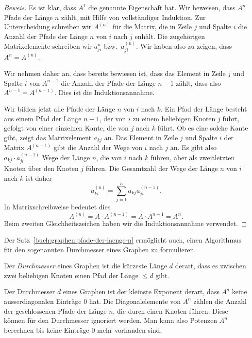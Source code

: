 \begin{proof}[Beweis]
Es ist klar, dass $A^1$ die genannte Eigenschaft hat.
Wir beweisen, dass $A^n$ Pfade der Länge $n$ zählt, mit Hilfe von
vollständiger Induktion.
Zur Unterscheidung schreiben wir $A^{(n)}$ für die Matrix, die in Zeile
$j$ und Spalte $i$ die Anzahl der Pfade der Länge $n$ von $i$ nach $j$
enhält.
Die zugehörigen Matrixelemente schreiben wir $a_{ji}^{n}$ bzw.~$a_{ji}^{(n)}$.
Wir haben also zu zeigen, dass $A^n = A^{(n)}$.

Wir nehmen daher an, dass bereits bewiesen ist, dass das Element in Zeile
$j$ und Spalte $i$ von $A^{n-1}$ die Anzahl der Pfade der Länge $n-1$
zählt, dass also $A^{n-1}=A^{(n-1)}$.
Dies ist die Induktionsannahme.

Wir bilden jetzt alle Pfade der Länge $n$ von $i$ nach $k$.
Ein Pfad der Länge besteht aus einem Pfad der Länge $n-1$, der von $i$ zu
einem beliebigen Knoten $j$ führt, gefolgt von einer einzelnen Kante,
die von $j$ nach $k$ führt.
Ob es eine solche Kante gibt, zeigt das Matrixelement $a_{kj}$ an.
Das Element in Zeile $j$ und Spalte $i$ der Matrix $A^{(n-1)}$ gibt
die Anzahl der Wege von $i$ nach $j$ an.
Es gibt also $a_{kj}\cdot a_{ji}^{(n-1)}$ Wege der Länge $n$, die von $i$
nach $k$ führen, aber als zweitletzten Knoten über den Knoten $j$ führen.
Die Gesamtzahl der Wege der Länge $n$ von $i$ nach $k$ ist daher
\[
a_{ki}^{(n)}
=
\sum_{j=1}^n a_{kj} a_{ji}^{(n-1)}.
\]
In Matrixschreibweise bedeutet dies
\[
A^{(n)}
=
A\cdot A^{(n-1)}
=
A\cdot A^{n-1}
=
A^n.
\]
Beim zweiten Gleichheitszeichen haben wir die Induktionsannahme
verwendet.
\end{proof}

Der Satz~\ref{buch:graphen:pfade-der-laenge-n} ermöglicht auch, einen 
Algorithmus für den sogenannten Durchmesser eines Graphen zu formulieren.

\begin{definition}
%
%
Der {\em Durchmesser} eines Graphen ist die kürzeste Länge $d$ derart, dass
es zwischen zwei beliebigen Knoten einen Pfad der Länge $\le d$ gibt.
\end{definition}

Der Durchmesser $d$ eines Graphen ist der kleinste Exponent derart,
dass $A^d$ keine ausserdiagonalen Einträge $0$ hat.
Die Diagonalelemente von $A^n$ zählen die Anzahl der geschlossenen Pfade
der Länge $n$, die durch einen Knoten führen.
Diese können für den Durchmesser ignoriert werden.
Man kann also Potenzen $A^n$ berechnen bis keine Einträge $0$ mehr vorhanden
sind.

